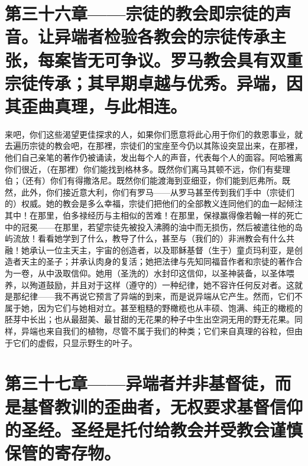 
\section{第三十六章——宗徒的教会即宗徒的声音。让异端者检验各教会的宗徒传承主张，每案皆无可争议。罗马教会具有双重宗徒传承；其早期卓越与优秀。异端，因其歪曲真理，与此相连。}

来吧，你们这些渴望更佳探求的人，如果你们愿意将此心用于你们的救恩事业，就去遍历宗徒的教会吧，在那裡，宗徒们的宝座至今仍以其陈设突显出来，在那裡，他们自己亲笔的著作仍被诵读，发出每个人的声音，代表每个人的面容。阿哈雅离你们很近，（在那裡）你们能找到格林多。既然你们离马其顿不远，你们有斐理伯；（还有）你们有得撒洛尼。既然你们能渡海到亚细亚，你们能到厄弗所。既然，此外，你们接近意大利，你们有罗马——从罗马甚至传到我们手中（宗徒们的）权威。她的教会是多么幸福，宗徒们把他们的全部教义连同他们的血一起倾注其中！在那里，伯多禄经历与主相似的苦难！在那里，保禄赢得像若翰一样的死亡中的冠冕——在那里，若望宗徒先被投入沸腾的油中而无损伤，然后被遣往他的岛屿流放！看看她学到了什么，教导了什么，甚至与（我们的）非洲教会有什么共融！她承认一位主天主，宇宙的创造者，以及耶稣基督（生于）童贞玛利亚，是创造者天主的圣子；并承认肉身的复活；她把法律与先知同福音作者和宗徒的著作合为一卷，从中汲取信仰。她用（圣洗的）水封印这信仰，以圣神装备，以圣体喂养，以殉道鼓励，并且对于这样（遵守的）一种纪律，她不容许任何反对者。这就是那纪律——我不再说它预言了异端的到来，而是说异端从它产生。然而，它们不属于她，因为它们与她相对立。甚至粗糙的野橄榄也从丰硕、饱满、纯正的橄榄的胚芽中长出；也从最甜美、最甘甜的无花果的种子中生出空洞无用的野无花果。同样，异端也来自我们的植物，尽管不属于我们的种类；它们来自真理的谷粒，但由于它们的虚假，只显示野生的叶子。\par


\section{第三十七章——异端者并非基督徒，而是基督教训的歪曲者，无权要求基督信仰的圣经。圣经是托付给教会并受教会谨慎保管的寄存物。}

